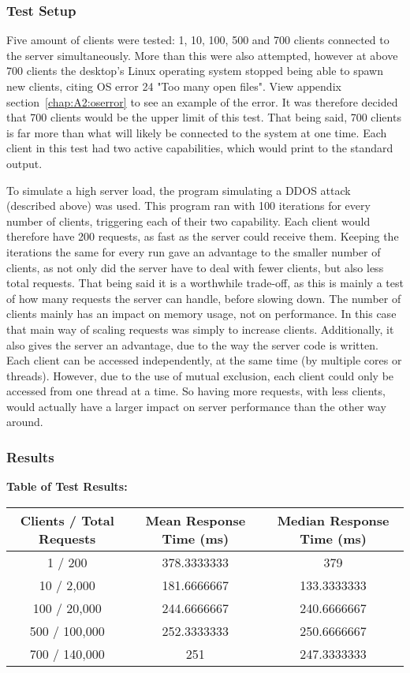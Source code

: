 \subsubsection{Test Setup}
Five amount of clients were tested: 1, 10, 100, 500 and 700 clients connected to the server simultaneously. More than this were also attempted, however at above 700 clients the desktop's Linux operating system stopped being able to spawn new clients, citing OS error 24 "Too many open files". View appendix section~\ref{chap:A2:oserror} to see an example of the error. It was therefore decided that 700 clients would be the upper limit of this test. That being said, 700 clients is far more than what will likely be connected to the system at one time. Each client in this test had two active capabilities, which would print to the standard output.

To simulate a high server load, the program simulating a DDOS attack (described above) was used. This program ran with 100 iterations for every number of clients, triggering each of their two capability. Each client would therefore have 200 requests, as fast as the server could receive them. Keeping the iterations the same for every run gave an advantage to the smaller number of clients, as not only did the server have to deal with fewer clients, but also less total requests. That being said it is a worthwhile trade-off, as this is mainly a test of how many requests the server can handle, before slowing down. The number of clients mainly has an impact on memory usage, not on performance. In this case that main way of scaling requests was simply to increase clients. Additionally, it also gives the server an advantage, due to the way the server code is written. Each client can be accessed independently, at the same time (by multiple cores or threads). However, due to the use of mutual exclusion, each client could only be accessed from one thread at a time. So having more requests, with less clients, would actually have a larger impact on server performance than the other way around.

\subsubsection{Results}
\begin{center}
    \textbf{Table of Test Results:} 
\begin{tabular}{ |c|c|c| } 
 \hline
 Clients / Total Requests & Mean Response Time (ms) & Median Response Time (ms)\\ 
 \hline
 1 / 200 & 378.3333333 & 379 \\ 
 \hline
 10 / 2,000 & 181.6666667 & 133.3333333 \\ 
 \hline
 100 / 20,000 & 244.6666667 & 240.6666667 \\ 
 \hline
 500 / 100,000 & 252.3333333 & 250.6666667 \\ 
 \hline
 700 / 140,000 & 251 & 247.3333333 \\ 
 \hline
\end{tabular}
\end{center}

